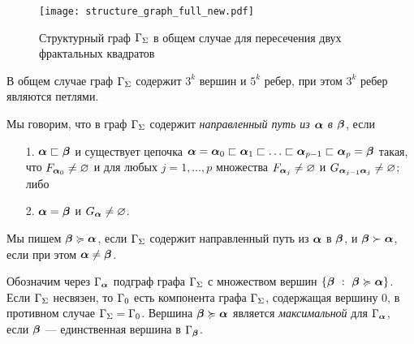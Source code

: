 \begin{figure}[h!]
    \centering
    \texttt{[image: structure\_graph\_full\_new.pdf]}
    \caption{Структурный граф $\Gamma_\Sigma$ в общем случае для пересечения двух фрактальных квадратов}
\end{figure}

В общем случае граф $\Gamma_\Sigma$ содержит $3^k$ вершин и $5^k$ ребер, при этом $3^k$ ребер являются петлями.





\begin{definition}
Мы говорим, что в граф $\Gamma_\Sigma$  содержит  {\em направленный путь из ${\bm{\alpha}}$ в ${\bm{\beta}}$}, если 
\begin{itemize}[nolistsep]
\item[1.] ${\bm{\alpha}}\sqsubset{\bm{\beta}}$ и существует цепочка ${\bm{\alpha}}={\bm{\alpha}}_0\sqsubset{\bm{\alpha}}_1\sqsubset\ldots\sqsubset{\bm{\alpha}}_{p-1}\sqsubset{\bm{\alpha}}_p={\bm{\beta}}$ такая, что $F_{{\bm{\alpha}}_0}\neq\varnothing$ и для любых  $j=1, \ldots, p$ множества $F_{{\bm{\alpha}}_j}\neq\varnothing$  и  $G_{{\bm{\alpha}}_{j-1}{\bm{\alpha}}_j}\neq\varnothing$; либо
\item[2.] ${\bm{\alpha}}={\bm{\beta}}$ и  $G_{{\bm{\alpha}}}\neq\varnothing$.
\end{itemize}
Мы пишем ${\bm{\beta}}\succcurlyeq{\bm{\alpha}}$, если  $\Gamma_\Sigma$ содержит направленный путь из ${\bm{\alpha}}$ в ${\bm{\beta}}$, и ${\bm{\beta}}\succ{\bm{\alpha}}$, если при этом ${\bm{\alpha}}\neq{\bm{\beta}}$.
\end{definition}
 
Обозначим через $\Gamma_{\bm{\alpha}}$ подграф графа $\Gamma_\Sigma$ с множеством вершин $\{{\bm{\beta}}\ :\ {\bm{\beta}}\succcurlyeq{\bm{\alpha}}\}$. 
Если $\Gamma_\Sigma$ несвязен, то $\Gamma_0$ есть компонента графа $\Gamma_\Sigma$, содержащая вершину $0$, в противном случае $\Gamma_\Sigma=\Gamma_0$.
Вершина ${\bm{\beta}}\succcurlyeq{\bm{\alpha}}$ является {\em максимальной} для $\Gamma_{\bm{\alpha}}$, если ${\bm{\beta}}$ --- единственная вершина в $\Gamma_{\bm{\beta}}$.




